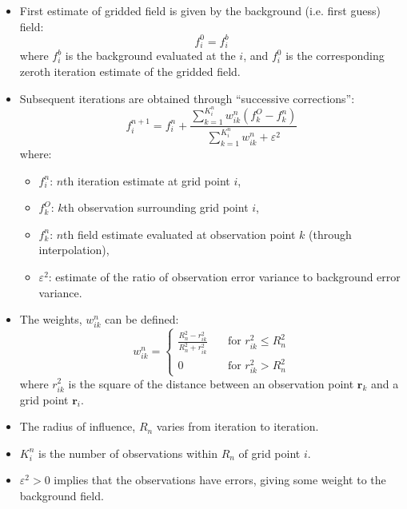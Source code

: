 \begin{itemize}
    \item First estimate of gridded field is given by the background (i.e. first guess) field:
    \begin{equation}
        f_i^0 = f_i^b
    \end{equation}
    where $f_i^b$ is the background evaluated at the $i$, and $f_i^0$ is the corresponding zeroth iteration estimate of the gridded field.
    \item Subsequent iterations are obtained through ``successive corrections'':
    \begin{equation}
        f_i^{n+1} = f_i^n + 
        \frac{\sum_{k=1}^{K_i^n} w_{ik}^n \left( f_k^O - f_k^n \right)}
        {\sum_{k=1}^{K_i^n} w_{ik}^n + \varepsilon^2}
    \end{equation}
    where:
    \begin{itemize}
        \item $f_i^n$: $n$th iteration estimate at grid point $i$,
        \item $f_k^O$: $k$th observation surrounding grid point $i$,
        \item $f_k^n$: $n$th field estimate evaluated at observation point $k$ (through interpolation),
        \item $\varepsilon^2$: estimate of the ratio of observation error variance to background error variance.
    \end{itemize}
    \item The weights, $w_{ik}^n$ can be defined:
    \begin{equation}
        w_{ik}^n =
        \begin{cases}
            \frac{R_n^2 - r_{ik}^2}{R_n^2 + r_{ik}^2}       & \quad \text{for } r_{ik}^2 \leq R_n^2
            \\
            0  & \quad \text{for } r_{ik}^2 > R_n^2
        \end{cases}
    \end{equation}
    where $r_{ik}^2$ is the square of the distance between an observation point $\mathbf{r}_k$ and a grid point $\mathbf{r}_i$. 
    \item The radius of influence, $R_n$ varies from iteration to iteration.
    \item $K_i^n$ is the number of observations within $R_n$ of grid point $i$.
    \item $\varepsilon^2 > 0$ implies that the observations have errors, giving some weight to the background field.
\end{itemize}

